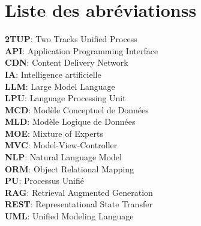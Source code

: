 \thispagestyle{empty}

\chapter*{Liste des abréviationss}

\noindent
\vspace{0.5em}
\textbf{2TUP}: Two Tracks Unified Process\\
\vspace{0.5em}
\textbf{API}: Application Programming Interface \\
\vspace{0.5em}
\textbf{CDN}: Content Delivery Network \\
\vspace{0.5em}
\textbf{IA}: Intelligence artificielle\\ 
\vspace{0.5em}
\textbf{LLM}: Large Model Language \\
\vspace{0.5em}
\textbf{LPU}: Language Processing Unit \\
\vspace{0.5em}
\textbf{MCD}: Modèle Conceptuel de Données \\ 
\vspace{0.5em}
\textbf{MLD}: Modèle Logique de Données \\
\vspace{0.5em}
\textbf{MOE}: Mixture of Experts \\
\vspace{0.5em}
\textbf{MVC}: Model-View-Controller \\
\vspace{0.5em}
\textbf{NLP}: Natural Language Model \\
\vspace{0.5em}
\textbf{ORM}: Object Relational Mapping \\
\vspace{0.5em}
\textbf{PU}: Processus Unifié \\
\vspace{0.5em}
\textbf{RAG}: Retrieval Augmented Generation \\
\vspace{0.5em}
\textbf{REST}: Representational State Transfer \\
\vspace{0.5em}
\textbf{UML}: Unified Modeling Language \\
 
